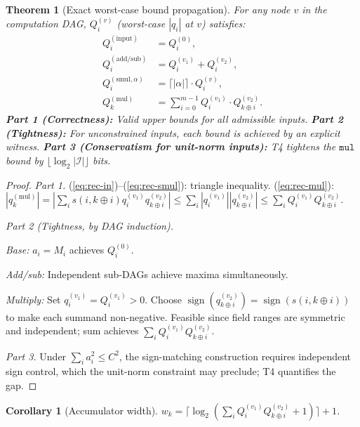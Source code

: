 \documentclass[11pt,a4paper]{article}
\theoremstyle{definition}
\theoremstyle{plain}
\newtheorem{theorem}{Theorem}[section]
\newtheorem{corollary}{Corollary}[section]
\theoremstyle{remark}
\begin{document}
\begin{theorem}[Exact worst-case bound propagation]
\label{thm:growth}
For any node $v$ in the computation DAG, $Q_i^{(v)}$
(worst-case $|q_i|$ at $v$) satisfies:
\begin{align}
  Q_i^{(\mathrm{input})} &= Q_i^{(0)},\label{eq:rec-in}\\
  Q_i^{(\mathrm{add/sub})} &= Q_i^{(v_1)}+Q_i^{(v_2)},\label{eq:rec-add}\\
  Q_i^{(\mathrm{smul},\alpha)} &= \lceil|\alpha|\rceil\cdot Q_i^{(v)},\label{eq:rec-smul}\\
  Q_k^{(\mathrm{mul})} &= \sum_{i=0}^{m-1}Q_i^{(v_1)}\cdot Q_{k\oplus i}^{(v_2)}.\label{eq:rec-mul}
\end{align}
\textbf{Part 1 (Correctness):} Valid upper bounds for all admissible inputs.
\textbf{Part 2 (Tightness):} For unconstrained inputs, each bound is
achieved by an explicit witness.
\textbf{Part 3 (Conservatism for unit-norm inputs):} T4 tightens the
$\mathtt{mul}$ bound by $\lfloor\log_2|\mathcal{I}|\rfloor$ bits.
\end{theorem}

\begin{proof}
\textit{Part 1.}
(\ref{eq:rec-in})--(\ref{eq:rec-smul}): triangle inequality.
(\ref{eq:rec-mul}): $|q_k^{(\mathrm{mul})}|
=|\sum_i s(i,k\oplus i)q_i^{(v_1)}q_{k\oplus i}^{(v_2)}|
\le\sum_i|q_i^{(v_1)}||q_{k\oplus i}^{(v_2)}|
\le\sum_i Q_i^{(v_1)}Q_{k\oplus i}^{(v_2)}.$

\textit{Part 2 (Tightness, by DAG induction).}

\emph{Base:} $a_i=M_i$ achieves $Q_i^{(0)}$.

\emph{Add/sub:} Independent sub-DAGs achieve maxima simultaneously.

\emph{Multiply:} Set $q_i^{(v_1)}=Q_i^{(v_1)}>0$.
Choose $\operatorname{sign}(q_{k\oplus i}^{(v_2)})=\operatorname{sign}(s(i,k\oplus i))$
to make each summand non-negative.
Feasible since field ranges are symmetric and independent;
sum achieves $\sum_i Q_i^{(v_1)}Q_{k\oplus i}^{(v_2)}$.

\textit{Part 3.} Under $\sum_i a_i^2\le C^2$, the sign-matching
construction requires independent sign control, which the unit-norm
constraint may preclude; T4 quantifies the gap.
\end{proof}

\begin{corollary}[Accumulator width]
\label{cor:accum}
$w_k=\lceil\log_2(\sum_i Q_i^{(v_1)}Q_{k\oplus i}^{(v_2)}+1)\rceil+1$.
\end{corollary}
\end{document}
